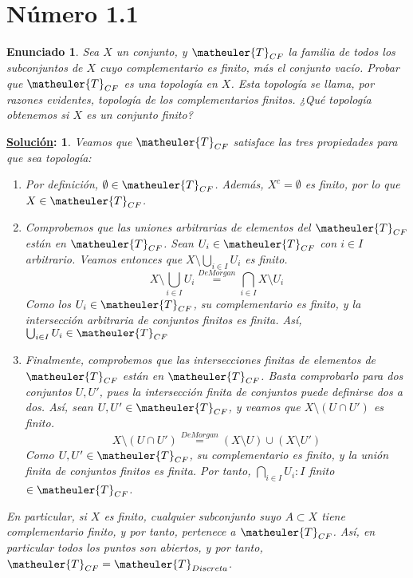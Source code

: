 \documentclass[10pt,a4paper,openright]{book}
\theoremstyle{break}
\newtheorem*{enun}{Enunciado}
\newtheorem*{sol}{\underline{Solución}:}
\begin{document}
\section{Número 1.1}
\begin{enun}
Sea $X$ un conjunto, y $\matheuler{T}_{CF}$ la familia de todos los subconjuntos de $X$ cuyo complementario es finito, más el conjunto vacío. Probar que $\matheuler{T}_{CF}$ es una topología en $X$. Esta topología se llama, por razones evidentes, \textit{topología de los complementarios finitos}. ¿Qué topología obtenemos si $X$ es un conjunto finito?
\end{enun}
\begin{sol}
Veamos que $\matheuler{T}_{CF}$ satisface las tres propiedades para que sea topología:
\begin{enumerate}[label={(\arabic*)}]
\item Por definición, $\emptyset \in \matheuler{T}_{CF}$. Además, $X^c = \emptyset$ es finito, por lo que $X \in \matheuler{T}_{CF}$.
\item Comprobemos que las uniones arbitrarias de elementos del $\matheuler{T}_{CF}$ están en $\matheuler{T}_{CF}$. Sean $U_i \in \matheuler{T}_{CF}$ con $i \in I$ arbitrario. Veamos entonces que $X \setminus \bigcup_{i \in I} U_i$ es finito.
$$X \setminus \bigcup_{i \in I} U_i \overset{De Morgan}{=} \bigcap_{i \in I}X \setminus U_i$$
Como los $U_i \in \matheuler{T}_{CF}$, su complementario es finito, y la intersección arbitraria de conjuntos finitos es finita. Así, $\bigcup_{i \in I} U_i \in \matheuler{T}_{CF}$
\item Finalmente, comprobemos que las intersecciones finitas de elementos de $\matheuler{T}_{CF}$ están en $\matheuler{T}_{CF}$. Basta comprobarlo para dos conjuntos $U, U'$, pues la intersección finita de conjuntos puede definirse dos a dos. Así, sean $U, U' \in \matheuler{T}_{CF}$, y veamos que $X \setminus (U \cap U')$ es finito.
$$X \setminus (U \cap U') \overset{De Morgan}{=} (X \setminus U) \cup (X \setminus U')$$
Como $U, U' \in \matheuler{T}_{CF}$, su complementario es finito, y la unión finita de conjuntos finitos es finita. Por tanto, $\bigcap_{i \in I} U_i : I $ finito $\in \matheuler{T}_{CF}$.
\end{enumerate}
En particular, si $X$ es finito, cualquier subconjunto suyo $A \subset X$ tiene complementario finito, y por tanto, pertenece a $\matheuler{T}_{CF}$. Así, en particular todos los puntos son abiertos, y por tanto, $\matheuler{T}_{CF} = \matheuler{T}_{Discreta}$.
\end{sol}
\end{document}
